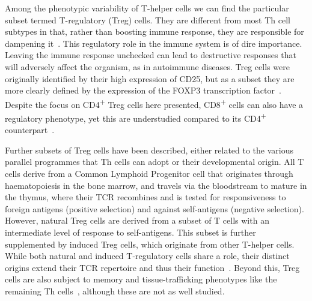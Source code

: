 Among the phenotypic variability of T-helper cells we can find the particular subset termed T-regulatory (Treg) cells. They are different from most Th cell subtypes in that, rather than boosting immune response, they are responsible for dampening it~\citep{sakaguchi_immunologic_1995}. This regulatory role in the immune system is of dire importance. Leaving the immune response unchecked can lead to destructive responses that will adversely affect the organism, as in autoimmune diseases. Treg cells were originally identified by their high expression of CD25, but as a subset they are more clearly defined by the expression of the FOXP3 transcription factor~\citep{hori_control_2003}. Despite the focus on CD4\textsuperscript{+} Treg cells here presented, CD8\textsuperscript{+} cells can also have a regulatory phenotype, yet this are understudied compared to its CD4\textsuperscript{+} counterpart~\citep{yu_recent_2018}.

Further subsets of Treg cells have been described, either related to the various parallel programmes that Th cells can adopt or their developmental origin. All T cells derive from a Common Lymphoid Progenitor cell that originates through haematopoiesis in the bone marrow, and travels via the bloodstream to mature in the thymus, where their TCR recombines and is tested for responsiveness to foreign antigens (positive selection) and against self-antigens (negative selection). However, natural Treg cells are derived from a subset of T cells with an intermediate level of response to self-antigens. This subset is further supplemented by induced Treg cells, which originate from other T-helper cells. While both natural and induced T-regulatory cells share a role, their distinct origins extend their TCR repertoire and thus their function~\citep{zhang_subsets_2014}. Beyond this, Treg cells are also subject to memory and tissue-trafficking phenotypes like the remaining Th cells~\citep{huehn_developmental_2004}, although these are not as well studied.

